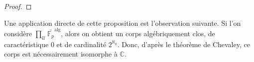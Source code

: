 \begin{proof}
\end{proof}

Une application directe de cette proposition est l'observation suivante. Si l'on considère $\prod_{\mathcal{U}}\bar{\mathbb{F}_{p}}^{\text{alg}}$, alors on obtient un corps algébriquement clos, de caractéristique $0$ et de cardinalité $2^{\aleph_{0}}$. Donc, d'après le théorème de Chevaley, ce corps est nécessairement isomorphe à $\mathbb{C}$.